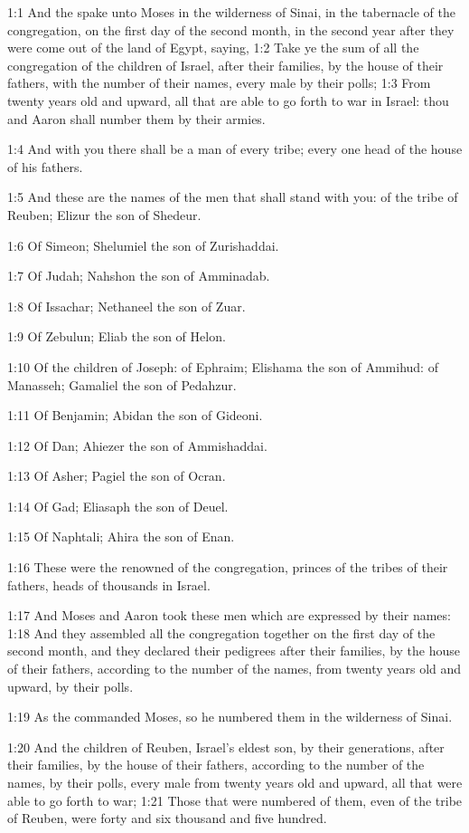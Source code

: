 

1:1 And the \LORD spake unto Moses in the wilderness of Sinai, in the
tabernacle of the congregation, on the first day of the second month,
in the second year after they were come out of the land of Egypt,
saying, 1:2 Take ye the sum of all the congregation of the children of
Israel, after their families, by the house of their fathers, with the
number of their names, every male by their polls; 1:3 From twenty
years old and upward, all that are able to go forth to war in Israel:
thou and Aaron shall number them by their armies.

1:4 And with you there shall be a man of every tribe; every one head
of the house of his fathers.

1:5 And these are the names of the men that shall stand with you: of
the tribe of Reuben; Elizur the son of Shedeur.

1:6 Of Simeon; Shelumiel the son of Zurishaddai.

1:7 Of Judah; Nahshon the son of Amminadab.

1:8 Of Issachar; Nethaneel the son of Zuar.

1:9 Of Zebulun; Eliab the son of Helon.

1:10 Of the children of Joseph: of Ephraim; Elishama the son of
Ammihud: of Manasseh; Gamaliel the son of Pedahzur.

1:11 Of Benjamin; Abidan the son of Gideoni.

1:12 Of Dan; Ahiezer the son of Ammishaddai.

1:13 Of Asher; Pagiel the son of Ocran.

1:14 Of Gad; Eliasaph the son of Deuel.

1:15 Of Naphtali; Ahira the son of Enan.

1:16 These were the renowned of the congregation, princes of the
tribes of their fathers, heads of thousands in Israel.

1:17 And Moses and Aaron took these men which are expressed by their
names: 1:18 And they assembled all the congregation together on the
first day of the second month, and they declared their pedigrees after
their families, by the house of their fathers, according to the number
of the names, from twenty years old and upward, by their polls.

1:19 As the \LORD commanded Moses, so he numbered them in the
wilderness of Sinai.

1:20 And the children of Reuben, Israel's eldest son, by their
generations, after their families, by the house of their fathers,
according to the number of the names, by their polls, every male from
twenty years old and upward, all that were able to go forth to war;
1:21 Those that were numbered of them, even of the tribe of Reuben,
were forty and six thousand and five hundred.

